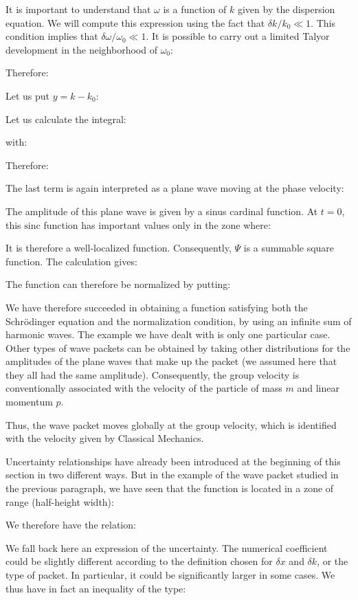 	It is important to understand that $\omega$ is a function of $k$ given by the dispersion equation. We will compute this expression using the fact that $\delta k/k_0\ll 1$. This condition implies that $\delta \omega/\omega_0\ll 1$. It is possible to carry out a limited Talyor development in the neighborhood of $\omega_0$:
	
	Therefore:
	
	Let us put $y=k-k_0$:
	
	Let us calculate the integral:
	
	with:
	
	Therefore:
	
	The last term is again interpreted as a plane wave moving at the phase velocity:
	
	The amplitude of this plane wave is given by a sinus cardinal function. At $t=0$, this $\mathrm{sinc}$ function has important values only in the zone where:
	
	It is therefore a well-localized function. Consequently, $\Psi$ is a summable square function. The calculation gives:
	
	The function can therefore be normalized by putting:
	
	We have therefore succeeded in obtaining a function satisfying both the Schrödinger equation and the normalization condition, by using an infinite sum of harmonic waves. The example we have dealt with is only one particular case. Other types of wave packets can be obtained by taking other distributions for the amplitudes of the plane waves that make up the packet (we assumed here that they all had the same amplitude). Consequently, the group velocity is conventionally associated with the velocity of the particle of mass $m$ and linear momentum $p$.

	Thus, the wave packet moves globally at the group velocity, which is identified with the velocity given by Classical Mechanics.

	Uncertainty relationships have already been introduced at the beginning of this section in two different ways. But in the example of the wave packet studied in the previous paragraph, we have seen that the function is located in a zone of range (half-height width):
	
	We therefore have the relation:
	
	We fall back here an expression of the uncertainty. The numerical coefficient could be slightly different according to the definition chosen for $\delta x$ and $\delta k$, or the type of packet. In particular, it could be significantly larger in some cases. We thus have in fact an inequality of the type:
	

